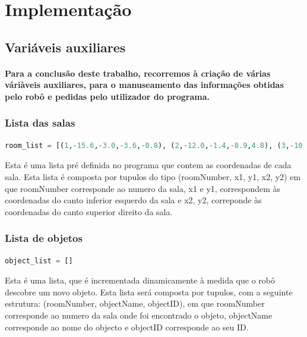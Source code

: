 \documentclass{article}
\begin{document}
\section{Implementação}

\subsection{Variáveis auxiliares}

\paragraph{Para a conclusão deste trabalho, recorremos à criação de várias váriàveis auxiliares, para o manuseamento das informações obtidas pelo robô e pedidas pelo utilizador do programa.}

\subsubsection{Lista das salas}
\begin{lstlisting}[language=Python]
room_list = [(1,-15.6,-3.0,-3.6,-0.8), (2,-12.0,-1.4,-8.9,4.8), (3,-10.6,4.8,3.6,7.9), (4,-4.6,-0.8,-0.8,4.8), (5,-15.6,-1.4,-12.5,3.0), (6,-15.6,3.0,-12.5,7.9), (7,-15.6,7.9,-10.6,11.1), (8,-10.6,7.9,-5.6,11.1), (9,-5.6,7.9,-0.5,11.1), (10,-0.5,7.9,3.6,11.1), (11,-0.8,1.4,3.6,4.8), (12,-0.8,-0.8,3.6,1.4), (13,-8.9,-0.8,-6.5,4.8),(14,-6.5,-0.8,-4.6,4.8)]
\end{lstlisting}

Esta é uma lista pré definida no programa que contem as coordenadas de cada sala. Esta lista é composta por tupulos do tipo (roomNumber, x1, y1, x2, y2) em que roomNumber corresponde ao numero da sala, x1 e y1, correspondem às coordenadas do canto inferior esquerdo da sala e x2, y2, correponde às coordenadas do canto superior direito da sala.

\subsubsection{Lista de objetos}
\begin{lstlisting}[language=Python]
object_list = []
\end{lstlisting}  

Esta é uma lista, que é incrementada dinamicamente à medida que o robô descobre um novo objeto. Esta lista será composta por tupulos, com a seguinte estrutura: (roomNumber, objectName, objectID), em que roomNumber corresponde ao numero da sala onde foi encontrado o objeto, objectName corresponde ao nome do objecto e objectID corresponde ao seu ID.
\end{document}
